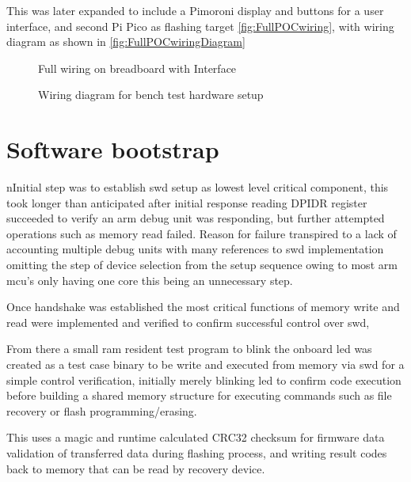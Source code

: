\pagebreak
This was later expanded to include a Pimoroni display and buttons for a user interface, and second Pi Pico as flashing target \autoref{fig:FullPOCwiring}, with wiring diagram as shown in \autoref{fig:FullPOCwiringDiagram}

\begin{figure}[ht]
	\centering
	\caption{Full wiring on breadboard with Interface}
	\label{fig:FullPOCwiring}
\end{figure}

\begin{figure}[ht]
	\centering
	\caption{Wiring diagram for bench test hardware setup}
	\label{fig:FullPOCwiringDiagram}
\end{figure}
\clearpage
\section{Software bootstrap}
nInitial step was to establish \gls{swd} setup as lowest level critical component, this took longer than anticipated after initial response reading DPIDR register succeeded to verify an \gls{arm} debug unit was responding, but further attempted operations such as memory read failed. Reason for failure transpired to a lack of accounting multiple debug units\cite{raspberrypiltdRaspberryPiPico} with many references to \gls{swd} implementation omitting the step of device selection from the setup sequence owing to most \gls{arm} \gls{mcu}'s only having one core this being an unnecessary step.

Once handshake was established the most critical functions of memory write and read were implemented and verified to confirm successful control over \gls{swd}, 

From there a small \gls{ram} resident test program to blink the onboard \gls{led} was created as a test case binary to be write and executed from memory via \gls{swd} for a simple control verification, initially merely blinking \gls{led} to confirm code execution before building a shared memory structure for executing commands such as file recovery or flash programming/erasing.

This uses a \gls{magic} and runtime calculated CRC32 checksum for firmware data validation of transferred data during flashing process, and writing result codes back to memory that can be read by recovery device.


